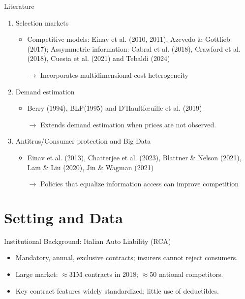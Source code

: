 \documentclass[10pt,aspectratio=169]{beamer}
\begin{document}
\begin{frame}{Literature}
\begin{enumerate}
  \item Selection markets 
  \begin{itemize}
    \item Competitive models: Einav et al. (2010, 2011), Azevedo \& Gottlieb (2017); Assymmetric information: Cabral et al. (2018), Crawford et al. (2018), Cuesta et al. (2021) and Tebaldi (2024)
    
    $\rightarrow$ Incorporates multidimensional cost heterogeneity
  \end{itemize}
  \item Demand estimation 
  \begin{itemize}
    \item Berry (1994),  BLP(1995) and  D'Haultfœuille et al. (2019) 
    
    $\rightarrow$ Extends demand estimation when prices are not observed. 
  \end{itemize}
  
  \item Antitrus/Consumer protection and Big Data  
  \begin{itemize}
    \item Einav et al. (2013), Chatterjee et al. (2023), Blattner \& Nelson (2021), Lam \& Liu (2020), Jin \& Wagman (2021)
    
    $\rightarrow$ Policies that equalize information access can improve competition
  \end{itemize}
\end{enumerate}
\end{frame}


 
\section{Setting and Data}

\begin{frame}{Institutional Background: Italian Auto Liability (RCA)}
\justifying
\begin{itemize}
  \item Mandatory, annual, exclusive contracts; insurers cannot reject consumers.
  \item Large market: $\approx$31M contracts in 2018; $\approx$50 national competitors.
  \item Key contract features widely standardized; little use of deductibles.
\end{itemize}
\end{frame}
\end{document}
